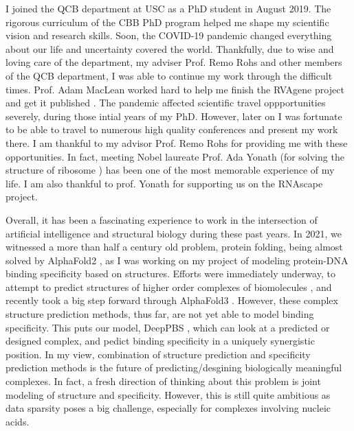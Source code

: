 
I joined the QCB department at USC as a PhD student in August 2019. The rigorous curriculum of the CBB PhD program helped me shape my scientific vision and research skills. Soon, the COVID-19 pandemic changed everything about our life and uncertainty covered the world. Thankfully, due to wise and loving care of the department, my adviser Prof. Remo Rohs and other members of the QCB department, I was able to continue my work through the difficult times. Prof. Adam MacLean worked hard to help me finish the RVAgene project and get it published \citep{Mitra2021}. The pandemic affected scientific travel oppportunities severely, during those intial years of my PhD. However, later on I was fortunate to be able to travel to numerous high quality conferences and present my work there. I am thankful to my advisor Prof. Remo Rohs for providing me with these opportunities. In fact, meeting Nobel laureate Prof. Ada Yonath (for solving the structure of ribosome \citep{schluenzen2000structure, harms2001high}) has been one of the most memorable experience of my life. I am also thankful to prof. Yonath for supporting us on the RNAscape project. 


Overall, it has been a fascinating experience to work in the intersection of artificial intelligence and structural biology during these past years. In 2021, we witnessed a more than half a century old problem, protein folding, being almost solved by AlphaFold2 \citep{Jumper2021}, as I was working on my project of modeling protein-DNA binding specificity based on structures. Efforts were immediately underway, to attempt to predict structures of higher order complexes of biomolecules \citep{evans2021protein,baek2024na}, and recently took a big step forward through AlphaFold3 \citep{Abramson2024}. However, these complex structure prediction methods, thus far, are not yet able to model binding specificity. This puts our model, DeepPBS \citep{Mitra2024}, which can look at a predicted or designed complex, and pedict binding specificity in a uniquely synergistic position. In my view, combination of structure prediction and specificity prediction methods is the future of predicting/desgining biologically meaningful complexes. In fact, a fresh direction of thinking about this problem is joint modeling of structure and specificity. However, this is still quite ambitious as data sparsity poses a big challenge, especially for complexes involving nucleic acids. 

